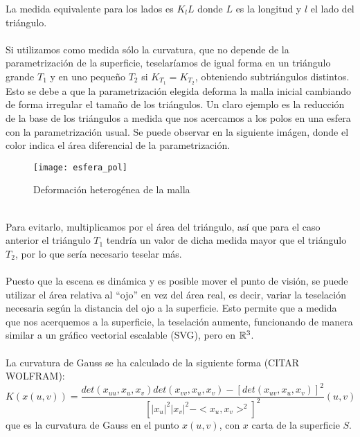 	La medida equivalente para los lados es $K_l L$ donde $L$ es la longitud y $l$ el lado del triángulo.\\
	\\Si utilizamos como medida sólo la curvatura, que no depende de la parametrización de la superficie, teselaríamos de igual forma en un triángulo grande $T_1$ y en uno pequeño $T_2$ si $K_{T_1}=K_{T_2}$, obteniendo subtriángulos distintos. Esto se debe a que la parametrización elegida deforma la malla inicial cambiando de forma irregular el tamaño de los triángulos. Un claro ejemplo es la reducción de la base de los triángulos a medida que nos acercamos a los polos en una esfera con la parametrización usual. Se puede observar en la siguiente imágen, donde el color indica el área diferencial de la parametrización.\\
	\begin{figure}[h]
  		\centering
  		\texttt{[image: esfera\_pol]}
  		\caption{Deformación heterogénea de la malla}
  		\label{fig:esfera_pol}
	\end{figure}
	\\Para evitarlo, multiplicamos por el área del triángulo, así que para el caso anterior el triángulo $T_1$ tendría un valor de dicha medida mayor que el triángulo $T_2$, por lo que sería necesario teselar más.\\
	\\Puesto que la escena es dinámica y es posible mover el punto de visión, se puede utilizar el área relativa al ``ojo'' en vez del área real, es decir, variar la teselación necesaria según la distancia del ojo a la superficie. Esto permite que a medida que nos acerquemos a la superficie, la teselación aumente, funcionando de manera similar a un gráfico vectorial escalable (SVG), pero en $\mathbb{R}^3$.\\
	\\La curvatura de Gauss se ha calculado de la siguiente forma (CITAR WOLFRAM):
		$$K(x(u,v)) = \frac{det(x_{uu}, x_u, x_v) det(x_{vv}, x_u, x_v) - [det(x_{uv}, x_u, x_v)]^2} {[|x_u|^2|x_v|^2 - <x_u, x_v>^2]^2} (u, v)$$
	que es la curvatura de Gauss en el punto $x(u, v)$, con $x$ carta de la superficie $S$.
	
\newpage
